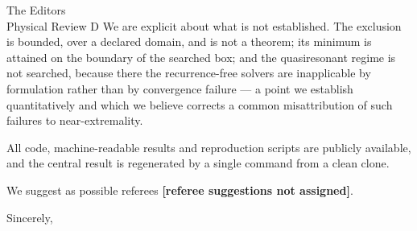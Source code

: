 \documentclass[11pt]{letter}
\newcommand{\TODO}[1]{\textbf{[#1]}}
\begin{document}
\begin{letter}{The Editors\\ Physical Review D}
We are explicit about what is not established. The exclusion is bounded, over a
declared domain, and is not a theorem; its minimum is attained on the boundary
of the searched box; and the quasiresonant regime is not searched, because there
the recurrence-free solvers are inapplicable by formulation rather than by
convergence failure --- a point we establish quantitatively and which we believe
corrects a common misattribution of such failures to near-extremality.

All code, machine-readable results and reproduction scripts are publicly
available, and the central result is regenerated by a single command from a
clean clone.

We suggest as possible referees \TODO{referee suggestions not assigned}.

\closing{Sincerely,}
\end{letter}
\end{document}
